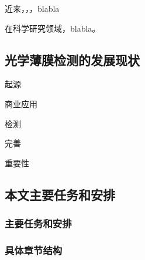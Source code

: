 近来，，，blabla

在科学研究领域，blabla。

\subsection{光学薄膜检测的发展现状}
起源

商业应用

检测

完善

重要性

\subsection{本文主要任务和安排}
\subsubsection{主要任务和安排}



\subsubsection{具体章节结构}


